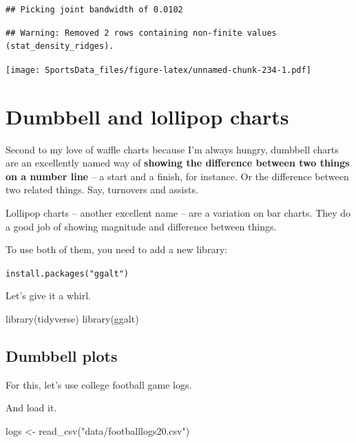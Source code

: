 \documentclass[
]{book}
\newenvironment{Shaded}{\begin{snugshade}}{\end{snugshade}}
\newcommand{\FunctionTok}[1]{\textcolor[rgb]{0.00,0.00,0.00}{#1}}
\newcommand{\NormalTok}[1]{#1}
\newcommand{\OtherTok}[1]{\textcolor[rgb]{0.56,0.35,0.01}{#1}}
\newcommand{\StringTok}[1]{\textcolor[rgb]{0.31,0.60,0.02}{#1}}
\begin{document}
\begin{verbatim}
## Picking joint bandwidth of 0.0102
\end{verbatim}

\begin{verbatim}
## Warning: Removed 2 rows containing non-finite values (stat_density_ridges).
\end{verbatim}

\texttt{[image: SportsData\_files/figure-latex/unnamed-chunk-234-1.pdf]}

\hypertarget{dumbbell-and-lollipop-charts}{%
\chapter{Dumbbell and lollipop charts}\label{dumbbell-and-lollipop-charts}}

Second to my love of waffle charts because I'm always hungry, dumbbell charts are an excellently named way of \textbf{showing the difference between two things on a number line} -- a start and a finish, for instance. Or the difference between two related things. Say, turnovers and assists.

Lollipop charts -- another excellent name -- are a variation on bar charts. They do a good job of showing magnitude and difference between things.

To use both of them, you need to add a new library:

\texttt{install.packages("ggalt")}

Let's give it a whirl.

\begin{Shaded}
\begin{Highlighting}[]
\FunctionTok{library}\NormalTok{(tidyverse)}
\FunctionTok{library}\NormalTok{(ggalt)}
\end{Highlighting}
\end{Shaded}

\hypertarget{dumbbell-plots}{%
\section{Dumbbell plots}\label{dumbbell-plots}}

For this, let's use college football game logs.

And load it.

\begin{Shaded}
\begin{Highlighting}[]
\NormalTok{logs }\OtherTok{\textless{}{-}} \FunctionTok{read\_csv}\NormalTok{(}\StringTok{"data/footballlogs20.csv"}\NormalTok{)}
\end{Highlighting}
\end{Shaded}
\end{document}

